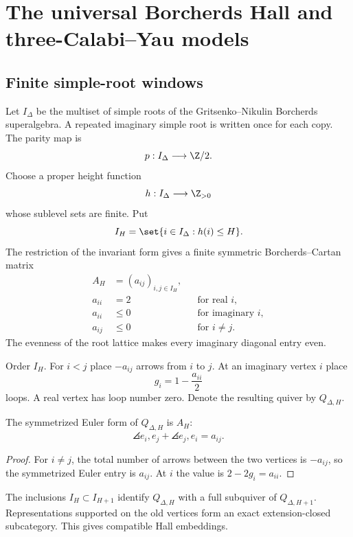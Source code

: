 \part{The universal Borcherds Hall and three-Calabi--Yau models}

\chapter{Finite simple-root windows}
Let $I_\Delta$ be the multiset of simple roots of the Gritsenko--Nikulin Borcherds superalgebra.  A repeated imaginary simple root is written once for each copy.  The parity map is
\[
 p:I_\Delta\longrightarrow\Z/2.
\]
Choose a proper height function
\[
 h:I_\Delta\longrightarrow\Z_{>0}
\]
whose sublevel sets are finite.  Put
\[
 I_H=\set{i\in I_\Delta:h(i)\le H}.
\]
The restriction of the invariant form gives a finite symmetric Borcherds--Cartan matrix
\[
\begin{aligned}
 A_H&=(a_{ij})_{i,j\in I_H},\\
 a_{ii}&=2 &&\text{for real }i,\\
 a_{ii}&\leq0 &&\text{for imaginary }i,\\
 a_{ij}&\leq0 &&\text{for }i\neq j.
\end{aligned}
\]
The evenness of the root lattice makes every imaginary diagonal entry even.

\begin{construction}
Order $I_H$.  For $i<j$ place $-a_{ij}$ arrows from $i$ to $j$.  At an imaginary vertex $i$ place
\[
 g_i=1-\frac{a_{ii}}2
\]
loops.  A real vertex has loop number zero.  Denote the resulting quiver by $Q_{\Delta,H}$.
\end{construction}

\begin{proposition}
The symmetrized Euler form of $Q_{\Delta,H}$ is $A_H$:
\[
 \angles{e_i,e_j}+\angles{e_j,e_i}=a_{ij}.
\]
\end{proposition}
\begin{proof}
For $i\ne j$, the total number of arrows between the two vertices is $-a_{ij}$, so the symmetrized Euler entry is $a_{ij}$.  At $i$ the value is $2-2g_i=a_{ii}$.
\end{proof}

The inclusions $I_H\subset I_{H+1}$ identify $Q_{\Delta,H}$ with a full subquiver of $Q_{\Delta,H+1}$.  Representations supported on the old vertices form an exact extension-closed subcategory.  This gives compatible Hall embeddings.


